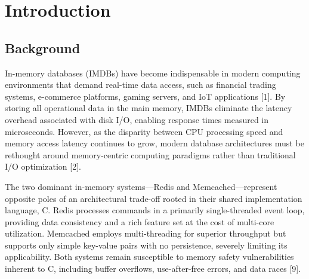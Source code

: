 \documentclass[12pt,a4paper]{report}
\begin{document}
\newpage
\vspace*{-2\baselineskip}
\listoffigures

\newpage
\vspace*{-2\baselineskip}
\listoftables

\newpage
\vspace*{-2\baselineskip}
\tableofcontents

\chapter{Introduction}

\section{Background}

In-memory databases (IMDBs) have become indispensable in modern computing environments that demand real-time data access, such as financial trading systems, e-commerce platforms, gaming servers, and IoT applications [1]. By storing all operational data in the main memory, IMDBs eliminate the latency overhead associated with disk I/O, enabling response times measured in microseconds. However, as the disparity between CPU processing speed and memory access latency continues to grow, modern database architectures must be rethought around memory-centric computing paradigms rather than traditional I/O optimization [2].

The two dominant in-memory systems---Redis and Memcached---represent opposite poles of an architectural trade-off rooted in their shared implementation language, C. Redis processes commands in a primarily single-threaded event loop, providing data consistency and a rich feature set at the cost of multi-core utilization. Memcached employs multi-threading for superior throughput but supports only simple key-value pairs with no persistence, severely limiting its applicability. Both systems remain susceptible to memory safety vulnerabilities inherent to C, including buffer overflows, use-after-free errors, and data races [9].
\end{document}
